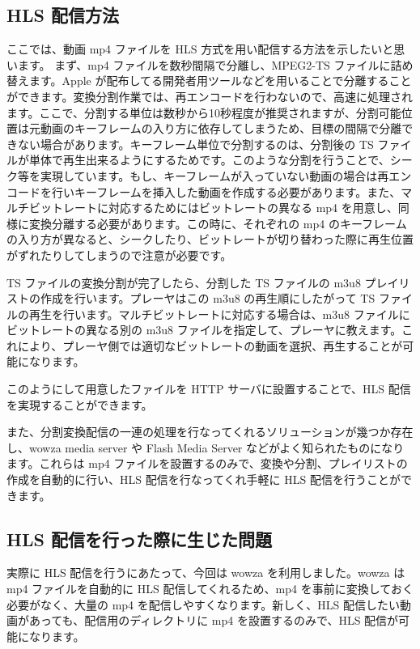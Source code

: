 \subsection{HLS 配信方法}
 ここでは、動画 mp4 ファイルを HLS 方式を用い配信する方法を示したいと思います。
 まず、mp4 ファイルを数秒間隔で分離し、MPEG2-TS ファイルに詰め替えます。Apple が配布してる開発者用ツールなどを用いることで分離することができます。変換分割作業では、再エンコードを行わないので、高速に処理されます。ここで、分割する単位は数秒から10秒程度が推奨されますが、分割可能位置は元動画のキーフレームの入り方に依存してしまうため、目標の間隔で分離できない場合があります。キーフレーム単位で分割するのは、分割後の TS ファイルが単体で再生出来るようにするためです。このような分割を行うことで、シーク等を実現しています。もし、キーフレームが入っていない動画の場合は再エンコードを行いキーフレームを挿入した動画を作成する必要があります。また、マルチビットレートに対応するためにはビットレートの異なる mp4 を用意し、同様に変換分離する必要があります。この時に、それぞれの mp4 のキーフレームの入り方が異なると、シークしたり、ビットレートが切り替わった際に再生位置がずれたりしてしまうので注意が必要です。

 TS ファイルの変換分割が完了したら、分割した TS ファイルの m3u8 プレイリストの作成を行います。プレーヤはこの m3u8 の再生順にしたがって TS ファイルの再生を行います。マルチビットレートに対応する場合は、m3u8 ファイルにビットレートの異なる別の m3u8 ファイルを指定して、プレーヤに教えます。これにより、プレーヤ側では適切なビットレートの動画を選択、再生することが可能になります。

 このようにして用意したファイルを HTTP サーバに設置することで、HLS 配信を実現することができます。

 また、分割変換配信の一連の処理を行なってくれるソリューションが幾つか存在し、wowza media server や Flash Media Server などがよく知られたものになります。これらは mp4 ファイルを設置するのみで、変換や分割、プレイリストの作成を自動的に行い、HLS 配信を行なってくれ手軽に HLS 配信を行うことができます。

\subsection{HLS 配信を行った際に生じた問題}
 実際に HLS 配信を行うにあたって、今回は wowza を利用しました。wowza は mp4 ファイルを自動的に HLS 配信してくれるため、mp4 を事前に変換しておく必要がなく、大量の mp4 を配信しやすくなります。新しく、HLS 配信したい動画があっても、配信用のディレクトリに mp4 を設置するのみで、HLS 配信が可能になります。

